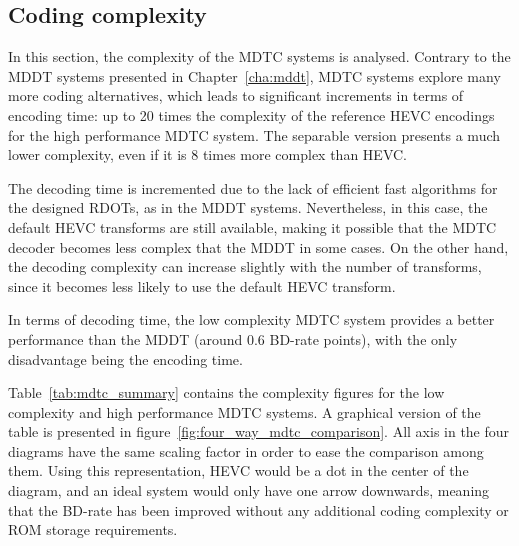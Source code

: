\documentclass[11pt,a4paper,openright,twoside]{book}
\numberwithin{equation}{section} %
\numberwithin{figure}{section} %
\numberwithin{table}{section} %
\begin{document}
\subsection{Coding complexity}
\label{sub:mdtc_coding_complexity}

In this section, the complexity of the \ac{MDTC} systems is analysed.
Contrary to the \ac{MDDT} systems presented in
Chapter~\ref{cha:mddt}, \ac{MDTC} systems explore many more coding
alternatives, which leads to significant increments in terms of encoding time:
up to 20 times the complexity of the reference \ac{HEVC} encodings for the
high performance \acs{MDTC} system.
The separable version presents a much lower complexity, even if it is 8 times
more complex than \ac{HEVC}.

The decoding time is incremented due to the lack of efficient fast algorithms
for the designed \acp{RDOT}, as in the \ac{MDDT} systems.
Nevertheless, in this case, the default \ac{HEVC} transforms are still
available, making it possible that the \ac{MDTC} decoder becomes less complex
that the \ac{MDDT} in some cases.
On the other hand, the decoding complexity can increase slightly with the
number of transforms, since it becomes less likely to use the default
\ac{HEVC} transform.

In terms of decoding time, the low complexity \ac{MDTC} system provides a
better performance than the \ac{MDDT} (around 0.6 \ac{BD}-rate points), with
the only disadvantage being the encoding time.

Table~\ref{tab:mdtc_summary} contains the complexity figures for the low
complexity and high performance \ac{MDTC} systems.
A graphical version of the table is presented in
figure~\ref{fig:four_way_mdtc_comparison}.
All axis in the four diagrams have the same scaling factor in order to ease
the comparison among them.
Using this representation, \acs{HEVC} would be a dot in the center of the
diagram, and an ideal system would only have one arrow downwards, meaning that
the \acs{BD}-rate has been improved without any additional coding complexity
or \acs{ROM} storage requirements.
\end{document}
